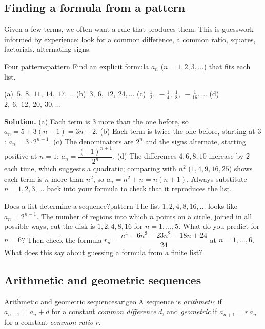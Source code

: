 \documentclass[11pt]{article}
\begin{document}
\subsection*{Finding a formula from a pattern}

Given a few terms, we often want a rule that produces them. This is guesswork informed by experience: look for a common difference, a common ratio, squares, factorials, alternating signs.

\begin{exmp}{Four patterns}{pattern}
Find an explicit formula $a_n$ ($n=1,2,3,\dots$) that fits each list.

(a)~$5,\ 8,\ 11,\ 14,\ 17,\dots$ \quad (b)~$3,\ 6,\ 12,\ 24,\dots$ \quad (c)~$\frac12,\ -\frac14,\ \frac18,\ -\frac1{16},\dots$ \quad (d)~$2,\ 6,\ 12,\ 20,\ 30,\dots$

\textbf{Solution.} (a) Each term is $3$ more than the one before, so $a_n=5+3(n-1)=3n+2$. (b) Each term is twice the one before, starting at $3$: $a_n=3\cdot2^{n-1}$. (c) The denominators are $2^n$ and the signs alternate, starting positive at $n=1$: $a_n=\dfrac{(-1)^{n+1}}{2^n}$. (d) The differences $4,6,8,10$ increase by $2$ each time, which suggests a quadratic; comparing with $n^2$ ($1,4,9,16,25$) shows each term is $n$ more than $n^2$, so $a_n=n^2+n=n(n+1)$.
Always substitute $n=1,2,3,\dots$ back into your formula to check that it reproduces the list.
\end{exmp}

\begin{think}{Does a list determine a sequence?}{pattern}
The list $1,2,4,8,16,\dots$ looks like $a_n=2^{n-1}$. The number of regions into which $n$ points on a circle, joined in all possible ways, cut the disk is $1,2,4,8,16$ for $n=1,\dots,5$. What do you predict for $n=6$? Then check the formula $r_n=\dfrac{n^4-6n^3+23n^2-18n+24}{24}$ at $n=1,\dots,6$. What does this say about guessing a formula from a finite list?
\end{think}

\subsection*{Arithmetic and geometric sequences}

\begin{defn}{Arithmetic and geometric sequences}{arigeo}
A sequence is \emph{arithmetic} if $a_{n+1}=a_n+d$ for a constant \emph{common difference} $d$, and \emph{geometric} if $a_{n+1}=r\,a_n$ for a constant \emph{common ratio} $r$.
\end{defn}
\end{document}
